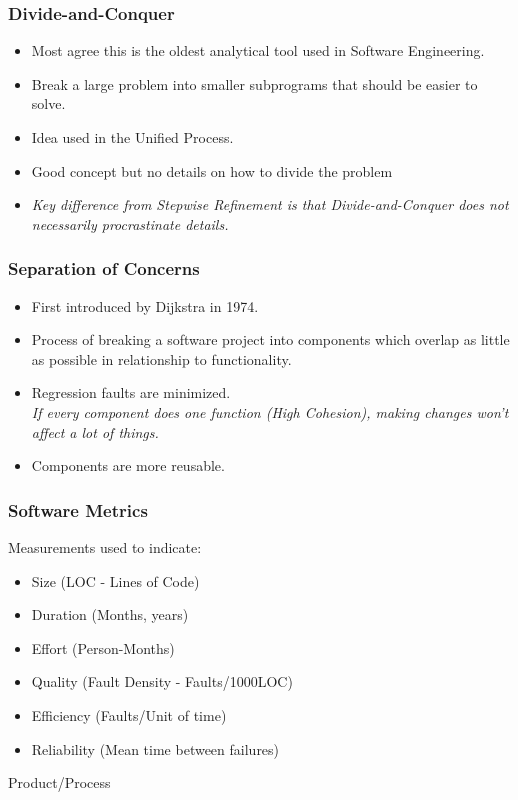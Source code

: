 \documentclass{report}
\begin{document}
				\subsubsection{Divide-and-Conquer}
					\begin{itemize}
						\item Most agree this is the oldest analytical tool used in Software Engineering.
						\item Break a large problem into smaller subprograms that should be easier to solve.
						\item Idea used in the Unified Process.
						\item Good concept but no details on how to divide the problem
						\item \textit{Key difference from Stepwise Refinement is that Divide-and-Conquer does not necessarily procrastinate details.}
					\end{itemize}
				\subsubsection{Separation of Concerns}
					\begin{itemize}
						\item First introduced by Dijkstra in 1974.
						\item Process of breaking a software project into components which overlap as little as possible in relationship to functionality.
						\item Regression faults are minimized.\\
							\textit{If every component does one function (High Cohesion), making changes won't affect a lot of things.}
						\item Components are more reusable.
					\end{itemize}
				\subsubsection{Software Metrics}
					Measurements used to indicate:
					\begin{itemize}
						\item Size (LOC - Lines of Code)
						\item Duration (Months, years)
						\item Effort (Person-Months)
						\item Quality (Fault Density - Faults/1000LOC)
						\item Efficiency (Faults/Unit of time)
						\item Reliability (Mean time between failures)
					\end{itemize}
					Product/Process
\end{document}
